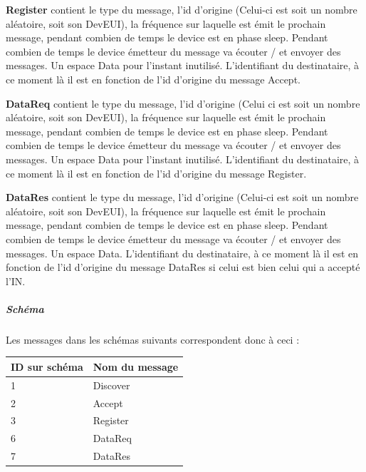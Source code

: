 \documentclass[a4paper, 11pt]{article}
\begin{document}
\textbf{Register} contient le type du message, l'id d'origine (Celui-ci est soit un nombre aléatoire, soit son DevEUI), la fréquence sur laquelle est émit le prochain message, pendant combien de temps le device est en phase sleep. Pendant combien de temps le device émetteur du message va écouter / et envoyer des messages. Un espace Data pour l'instant inutilisé. L'identifiant du destinataire, à ce moment là il est en fonction de l'id d'origine du message Accept.

\textbf{DataReq} contient le type du message, l'id d'origine (Celui ci est soit un nombre aléatoire, soit son DevEUI), la fréquence sur laquelle est émit le prochain message, pendant combien de temps le device est en phase sleep. Pendant combien de temps le device émetteur du message va écouter / et envoyer des messages. Un espace Data pour l'instant inutilisé. L'identifiant du destinataire, à ce moment là il est en fonction de l'id d'origine du message Register.

\textbf{DataRes} contient le type du message, l'id d'origine (Celui-ci est soit un nombre aléatoire, soit son DevEUI), la fréquence sur laquelle est émit le prochain message, pendant combien de temps le device est en phase sleep. Pendant combien de temps le device émetteur du message va écouter / et envoyer des messages. Un espace Data. L'identifiant du destinataire, à ce moment là il est en fonction de l'id d'origine du message DataRes si celui est bien celui qui a accepté l'IN.
\newpage
\subparagraph{Schéma}
Les messages dans les schémas suivants correspondent donc à ceci : 
\begin{table}[]
\centering
\begin{tabular}{|l|l|}
\hline
ID sur schéma & Nom du message                   \\ \hline
1             & \cellcolor[HTML]{FFFFFF}Discover \\ \hline
2             & \cellcolor[HTML]{FFFFFF}Accept   \\ \hline
3             & \cellcolor[HTML]{FFFFFF}Register \\ \hline
6             & \cellcolor[HTML]{FFFFFF}DataReq  \\ \hline
7            & \cellcolor[HTML]{FFFFFF}DataRes  \\ \hline
\end{tabular}
\end{table}
\end{document}
